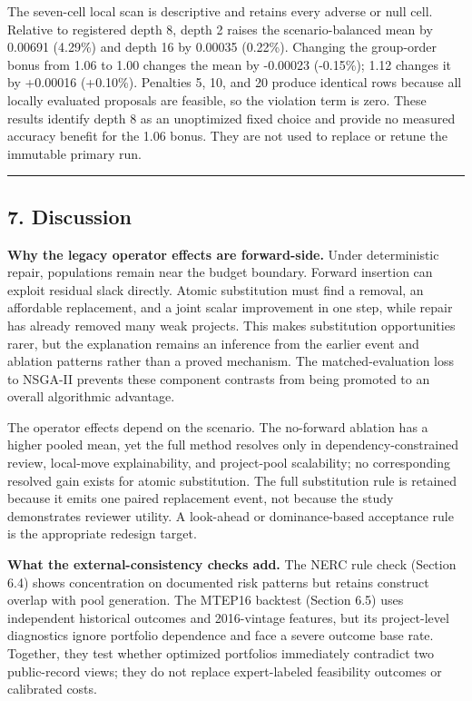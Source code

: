 \documentclass[
]{article}
\begin{document}
The seven-cell local scan is descriptive and retains every adverse or null cell. Relative to registered depth 8, depth 2 raises the scenario-balanced mean by 0.00691 (4.29\%) and depth 16 by 0.00035 (0.22\%). Changing the group-order bonus from 1.06 to 1.00 changes the mean by -0.00023 (-0.15\%); 1.12 changes it by +0.00016 (+0.10\%). Penalties 5, 10, and 20 produce identical rows because all locally evaluated proposals are feasible, so the violation term is zero. These results identify depth 8 as an unoptimized fixed choice and provide no measured accuracy benefit for the 1.06 bonus. They are not used to replace or retune the immutable primary run.

\begin{center}\rule{0.5\linewidth}{0.5pt}\end{center}

\subsection{7. Discussion}\label{discussion}

\textbf{Why the legacy operator effects are forward-side.} Under deterministic repair, populations remain near the budget boundary. Forward insertion can exploit residual slack directly. Atomic substitution must find a removal, an affordable replacement, and a joint scalar improvement in one step, while repair has already removed many weak projects. This makes substitution opportunities rarer, but the explanation remains an inference from the earlier event and ablation patterns rather than a proved mechanism. The matched-evaluation loss to NSGA-II prevents these component contrasts from being promoted to an overall algorithmic advantage.

The operator effects depend on the scenario. The no-forward ablation has a higher pooled mean, yet the full method resolves only in dependency-constrained review, local-move explainability, and project-pool scalability; no corresponding resolved gain exists for atomic substitution. The full substitution rule is retained because it emits one paired replacement event, not because the study demonstrates reviewer utility. A look-ahead or dominance-based acceptance rule is the appropriate redesign target.

\textbf{What the external-consistency checks add.} The NERC rule check (Section 6.4) shows concentration on documented risk patterns but retains construct overlap with pool generation. The MTEP16 backtest (Section 6.5) uses independent historical outcomes and 2016-vintage features, but its project-level diagnostics ignore portfolio dependence and face a severe outcome base rate. Together, they test whether optimized portfolios immediately contradict two public-record views; they do not replace expert-labeled feasibility outcomes or calibrated costs.
\end{document}
